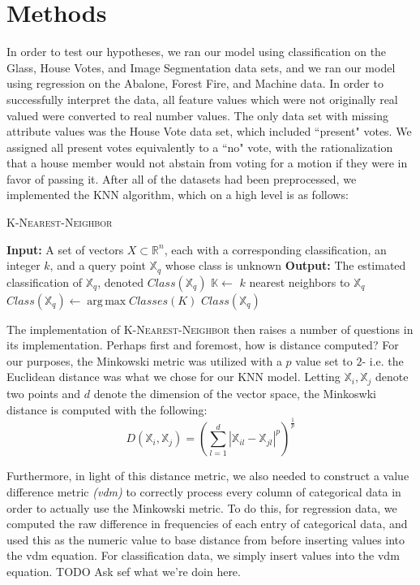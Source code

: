 \documentclass[twoside,11pt]{article}
\DeclareMathOperator*{\argmax}{arg\,max}
\begin{document}
\section{Methods}
In order to test our hypotheses, we ran our model using classification on the Glass, House Votes, and Image Segmentation data sets, and 
we ran our model using regression on the Abalone, Forest Fire, and Machine data. In order to successfully interpret the data, all feature values
which were not originally real valued were converted to real number values. The only data set with missing attribute values was the House Vote
data set, which included ``present" votes. We assigned all present votes equivalently to a ``no" vote, with the rationalization that a house member
would not abstain from voting for a motion if they were in favor of passing it. After all of the datasets had been preprocessed, we implemented the
KNN algorithm, which on a high level is as follows:
\begin{algorithm}
\begin{algorithmic}
\caption{\textsc{K-Nearest-Neighbor}}
\STATE \textbf{Input:} A set of vectors $X \subset \mathbb{R}^n$, each with a corresponding classification, an integer $k$, and a query point $\mathbb{X}_q$ whose class is unknown
\STATE \textbf{Output:} The estimated classification of $\mathbb{X}_q$, denoted $Class(\mathbb{X}_q)$
\STATE $\mathbb{K} \gets$ $k$ nearest neighbors to $\mathbb{X}_q$
\STATE $Class(\mathbb{X}_q) \gets \argmax{Classes(K)}$ 
\STATE \RETURN $Class(\mathbb{X}_q)$
\end{algorithmic}
\end{algorithm}

The implementation of \textsc{K-Nearest-Neighbor} then raises a number of questions in its implementation. Perhaps first and foremost, how is
distance computed? For our purposes, the Minkowski metric was utilized with a $p$ value set to $2$- i.e. the Euclidean distance was
what we chose for our KNN model. Letting $\mathbb{X}_i, \mathbb{X}_j$ denote two points and $d$ denote the dimension of the vector space,
the Minkoswki distance is computed with the following:
\begin{equation}
D(\mathbb{X}_i, \mathbb{X}_j) = (\sum_{l = 1}^{d} |\mathbb{X}_{il} - \mathbb{X}_{jl}|^p)^\frac{1}{p}
\end{equation}

Furthermore, in light of this distance metric, we also needed to construct a value difference metric \textit{(vdm)} to correctly process every column of
categorical data in order to actually use the Minkowski metric. To do this, for regression data, we computed the raw difference in frequencies
of each entry of categorical data, and used this as the numeric value to base distance from before inserting values into the vdm equation.
 For classification data, we simply insert values into the vdm equation. 
 TODO Ask sef what we're doin here.
 
\end{document}
